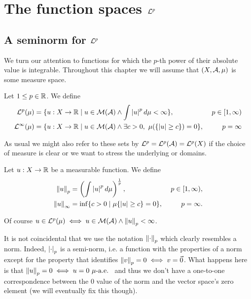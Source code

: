 
\chapter{\texorpdfstring{The function spaces $\mathcal{L}^p$}{The function spaces Lp}}

\section{\texorpdfstring{A seminorm for $\mathcal{L}^p$}{A seminorm for Lp}}

We turn our attention to functions for which the $p$-th power of their absolute value is integrable. Throughout this chapter we will assume that $(X, \mathcal{A}, \mu)$ is some measure space.

\begin{dfn}
	Let $1 \leq p \in \mathbb{R}$. We define
	\begin{align}
		\mathcal{L}^p(\mu) &= \{u : X \to \mathbb{R} \mid u \in \mathcal{M}(\mathcal{A}) \land \int \left\vert{u}\right\vert^p d\mu < \infty  \},\ &p \in [1, \infty) \\
		\mathcal{L}^\infty(\mu) &= \{u : X \to \mathbb{R} \mid u \in \mathcal{M}(\mathcal{A}) \land \exists c > 0,\ \mu(\{\left\vert{u}\right\vert \geq c\}) = 0\},\ &p = \infty
	\end{align}
\end{dfn}

As usual we might also refer to these sets by $\mathcal{L}^p = \mathcal{L}^p(\mathcal{A}) = \mathcal{L}^p(X)$ if the choice of measure is clear or we want to stress the underlying \sigas or domains.

\begin{dfn}[$p$-seminorm]
	\label{dfn:p-seminorm}
	Let $u: X \to \mathbb{R}$ be a measurable function. We define
	\begin{align}
		\left\Vert{u}\right\Vert_p &= \left(\int \left\vert{u}\right\vert^p d \mu \right)^{\frac{1}{p}},\ &p \in [1,\infty), \\
		\left\Vert{u}\right\Vert_\infty &= \inf \{ c > 0 \mid \mu\{\left\vert{u}\right\vert \geq c \} = 0\},\ &p = \infty.
	\end{align}
\end{dfn}

\begin{remark}
	Of course $u \in \mathcal{L}^p(\mu) \iff u \in \mathcal{M}(\mathcal{A}) \land \left\Vert{u}\right\Vert_p < \infty$.
\end{remark}

It is not coincidental that we use the notation $\left\Vert{\cdot}\right\Vert_p$ which clearly resembles a norm. Indeed, $\left\vert{\cdot}\right\vert_p$ is a semi-norm, i.e. a function with the properties of a norm except for the property that identifies $\left\Vert{v}\right\Vert_p = 0 \iff v = \vec{0}$. What happens here is that $\left\Vert{u}\right\Vert_p = 0 \iff u = 0 \ \mu\text{-a.e. }$ and thus we don't have a one-to-one correspondence between the 0 value of the norm and the vector space's zero element (we will eventually fix this though).

